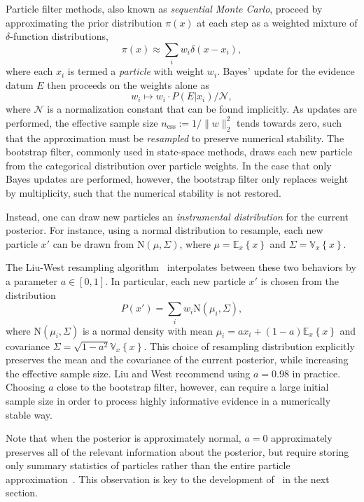 \documentclass[twoside]{article}
\newcommand{\expect}[2]{{\mathbb{E}_{#2}}\!\left\{#1 \right\}}
\newcommand{\var}[2]{{\mathbb{V}_{#2}}\!\left\{#1 \right\}}
\newcommand{\CRej}{\text{rejection filtering}}
\newcommand{\ess}{\mathrm{ess}}
\newcommand{\NN}{\mathrm{N}}
\newcommand{\defeq}{\mathrel{:=}}
\begin{document}
Particle filter methods, also known as \emph{sequential Monte Carlo}, proceed
by approximating the prior distribution $\pi(x)$ at each step as a weighted
mixture of $\delta$-function distributions,
\begin{equation}
    \pi(x) \approx \sum_i w_i \delta(x - x_i),
\end{equation}
where each $x_i$ is termed a \emph{particle} with weight $w_i$.
Bayes' update for the evidence datum $E$ then proceeds on the weights alone as
\begin{equation}
    w_i \mapsto w_i \cdot P(E | x_i) / \mathcal{N},
\end{equation}
where $\mathcal{N}$ is a normalization constant that can be found implicitly.
As updates are performed, the effective sample size $n_\ess \defeq
1 / \|w\|_2^2$ tends towards zero, such that the approximation must be
\emph{resampled} to preserve numerical stability. The bootstrap filter,
commonly used in state-space methods, draws each new particle from the categorical
distribution over particle weights. In the case that only Bayes updates are
performed, however, the bootstrap filter only replaces weight by multiplicity,
such that the numerical stability is not restored.

Instead, one can draw new particles an \emph{instrumental distribution} for
the current posterior. For instance, using a normal distribution to resample,
each new particle $x'$ can be drawn from $\NN(\mu, \Sigma)$, where
$\mu = \expect{x}{x}$ and $\Sigma = \var{x}{x}$.

The Liu-West resampling algorithm~\cite{liu2001combined} interpolates between these two
behaviors by a parameter $a \in [0, 1]$. In particular, each new particle
$x'$ is chosen from the distribution
\begin{equation}
  \label{eq:liu-west}
  P(x') = \sum_i w_i \NN(\mu_i, \Sigma),
\end{equation}
where $\NN(\mu_i, \Sigma)$ is a normal density with mean
$\mu_i = a x_i + (1 - a) \expect xx$
and covariance $\Sigma = \sqrt{1 - a^2} \var{x}{x}$.
This choice of resampling distribution explicitly preserves the mean
and the covariance of the current posterior, while increasing the
effective sample size. Liu and West recommend using $a = 0.98$ in practice.
Choosing $a$ close to the bootstrap filter, however, can require a large
initial sample size in order to process highly informative evidence
in a numerically stable way. 

Note that when the posterior is approximately normal, $a = 0$ approximately
preserves all of the relevant information about the posterior, but require
storing only summary statistics of particles rather than the entire particle
approximation~\cite{sisson_sequential_2007,del2012adaptive}.   This observation is key to
the development of \CRej~in the next section.
\end{document}
